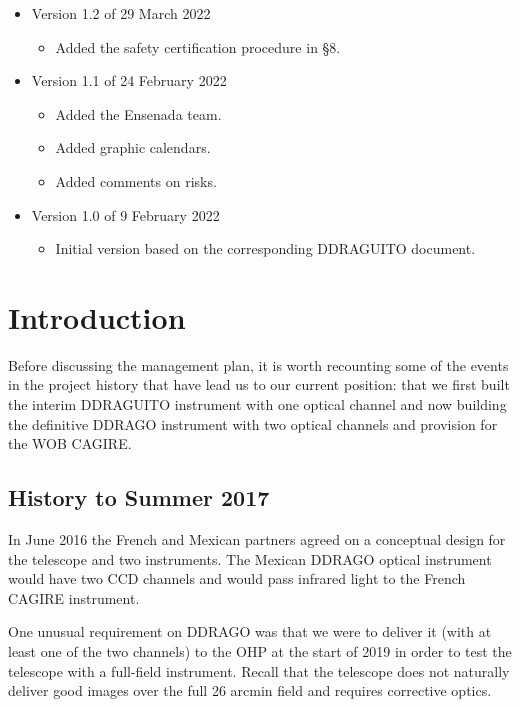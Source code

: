 \documentclass{article}
\begin{document}
\begin{itemize}

\item Version 1.2 of 29 March 2022
\begin{itemize}
    \item Added the safety certification procedure in \S8.
\end{itemize}
\item Version 1.1 of 24 February 2022
\begin{itemize}
    \item Added the Ensenada team.
    \item Added graphic calendars.
    \item Added comments on risks.
\end{itemize}

\item Version 1.0 of 9 February 2022
\begin{itemize}
    \item Initial version based on the corresponding DDRAGUITO document.
\end{itemize}
\end{itemize}
\clearpage


\section{Introduction}

Before discussing the management plan, it is worth recounting some of the events in the project history that have lead us to our current position: that we first built the interim DDRAGUITO instrument with one optical channel  and now building the definitive DDRAGO instrument with two optical channels and provision for the WOB CAGIRE.

\subsection{History to Summer 2017}

In June 2016 the French and Mexican partners agreed on a conceptual design for the telescope and two instruments. The Mexican DDRAGO optical instrument would have two CCD channels and would pass infrared light to the French CAGIRE instrument. 

One unusual requirement on DDRAGO was that we were to deliver it (with at least one of the two channels) to the OHP at the start of 2019 in order to test the telescope with a full-field instrument. Recall that the telescope does not naturally deliver good images over the full 26 arcmin field and requires corrective optics.
\end{document}
